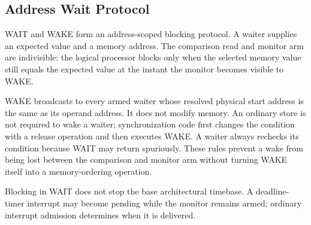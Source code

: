 \subsection{Address Wait Protocol}\label{section:address-wait-protocol}
WAIT and WAKE form an address-scoped blocking protocol. A waiter supplies an expected value and a memory address.
The comparison read and monitor arm are indivisible: the logical processor blocks only when the selected memory
value still equals the expected value at the instant the monitor becomes visible to WAKE.

WAKE broadcasts to every armed waiter whose resolved physical start address is the same as its operand address.
It does not modify memory. An ordinary store is not required to wake a waiter; synchronization code first changes
the condition with a release operation and then executes WAKE. A waiter always rechecks its condition because WAIT
may return spuriously. These rules prevent a wake from being lost between the comparison and monitor arm without
turning WAKE itself into a memory-ordering operation.

Blocking in WAIT does not stop the base architectural timebase. A deadline-timer interrupt may become pending while
the monitor remains armed; ordinary interrupt admission determines when it is delivered.
